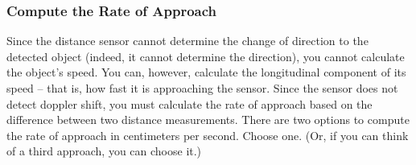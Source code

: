 \subsubsection{Compute the Rate of Approach} \label{subsubsec:approachRate}

Since the distance sensor cannot determine the change of direction to the detected object (indeed, it cannot determine the direction), you cannot calculate the object's speed.
You can, however, calculate the longitudinal component of its speed -- that is, how fast it is approaching the sensor.
Since the sensor does not detect doppler shift, you must calculate the rate of approach based on the difference between two distance measurements.
There are two options to compute the rate of approach in centimeters per second.
Choose one.
(Or, if you can think of a third approach, you can choose it.)

